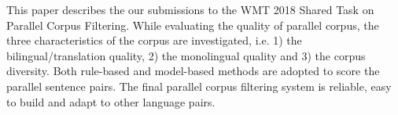 This paper describes the our submissions to the WMT 2018 Shared Task on Parallel Corpus Filtering. While evaluating the quality of parallel corpus, the three characteristics of the corpus are investigated, i.e. 1) the bilingual/translation quality, 2) the monolingual quality and 3) the corpus diversity.  Both rule-based and model-based methods are adopted to score the parallel sentence pairs. The final parallel corpus filtering system is reliable, easy to build and adapt to other language pairs.
